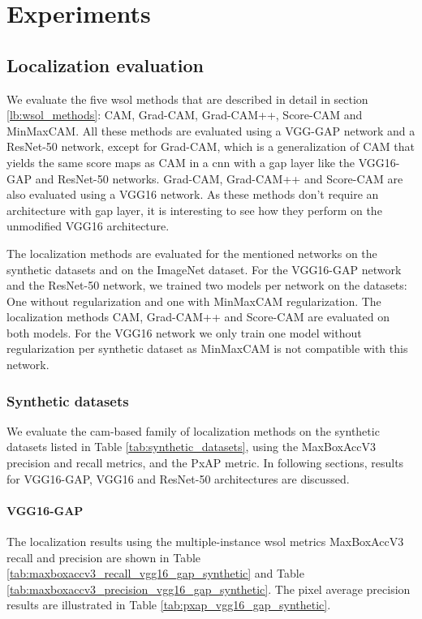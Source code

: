 \chapter{Experiments} \label{ch:experiments}

\section{Localization evaluation}
We evaluate the five \acrshort{wsol} methods that are described in detail in section \ref{lb:wsol_methods}: CAM, Grad-CAM, Grad-CAM++, Score-CAM and MinMaxCAM. All these methods are evaluated using a VGG-GAP network and a ResNet-50 network, except for Grad-CAM, which is a generalization of CAM that yields the same score maps as CAM in a \acrshort{cnn} with a \acrshort{gap} layer like the VGG16-GAP and ResNet-50 networks. Grad-CAM, Grad-CAM++ and Score-CAM are also evaluated using a VGG16 network. As these methods don't require an architecture with \acrshort{gap} layer, it is interesting to see how they perform on the unmodified VGG16 architecture.

The localization methods are evaluated for the mentioned networks on the synthetic datasets and on the ImageNet dataset. For the VGG16-GAP network and the ResNet-50 network, we trained two models per network on the datasets: One without regularization and one with MinMaxCAM regularization. The localization methods CAM, Grad-CAM++ and Score-CAM are evaluated on both models. For the VGG16 network we only train one model without regularization per synthetic dataset as MinMaxCAM is not compatible with this network. 

\subsection{Synthetic datasets}
We evaluate the \acrshort{cam}-based family of localization methods on the synthetic datasets listed in Table \ref{tab:synthetic_datasets}, using the MaxBoxAccV3 precision and recall metrics, and the PxAP metric. In following sections, results for VGG16-GAP, VGG16 and ResNet-50 architectures are discussed.

\subsubsection{VGG16-GAP}
The localization results using the multiple-instance \acrshort{wsol} metrics MaxBoxAccV3 recall and precision are shown in Table \ref{tab:maxboxaccv3_recall_vgg16_gap_synthetic} and Table \ref{tab:maxboxaccv3_precision_vgg16_gap_synthetic}. The pixel average precision results are illustrated in Table \ref{tab:pxap_vgg16_gap_synthetic}. 

